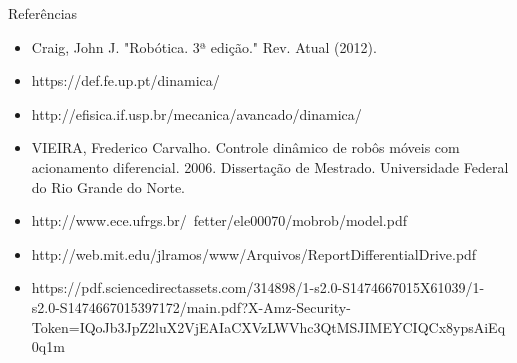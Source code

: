 \documentclass{beamer}
\begin{document}
\begin{frame}

\end{frame}




\begin{frame}[t]{Referências}
    \begin{itemize}
        \item Craig, John J. "Robótica. 3ª edição." Rev. Atual (2012).
        \item https://def.fe.up.pt/dinamica/ 
        \item http://efisica.if.usp.br/mecanica/avancado/dinamica/
        \item VIEIRA, Frederico Carvalho. Controle dinâmico de robôs móveis com acionamento diferencial. 2006. Dissertação de Mestrado. Universidade Federal do Rio Grande do Norte.
        \item http://www.ece.ufrgs.br/~fetter/ele00070/mobrob/model.pdf
        \item http://web.mit.edu/jlramos/www/Arquivos/ReportDifferentialDrive.pdf
        \item https://pdf.sciencedirectassets.com/314898/1-s2.0-S1474667015X61039/1-s2.0-S1474667015397172/main.pdf?X-Amz-Security-Token=IQoJb3JpZ2luX2VjEAIaCXVzLWVhc3QtMSJIMEYCIQCx8ypsAiEq0q1m%
    \end{itemize}
\end{frame}
\end{document}

